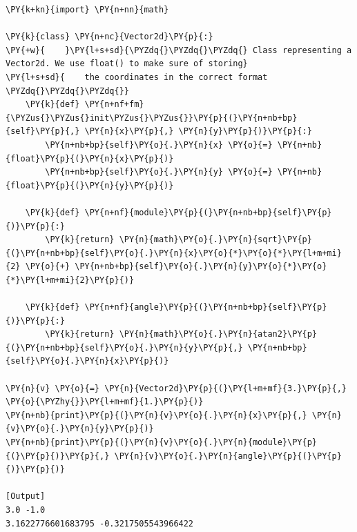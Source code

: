 \begin{Verbatim}[label=\makebox{\url{https://github.com/lucabaldini/cmepda/tree/master/slides/latex/snippets/vector2d\_xy.py}},commandchars=\\\{\}]
\PY{k+kn}{import} \PY{n+nn}{math}

\PY{k}{class} \PY{n+nc}{Vector2d}\PY{p}{:}
\PY{+w}{    }\PY{l+s+sd}{\PYZdq{}\PYZdq{}\PYZdq{} Class representing a Vector2d. We use float() to make sure of storing}
\PY{l+s+sd}{    the coordinates in the correct format \PYZdq{}\PYZdq{}\PYZdq{}}   
    \PY{k}{def} \PY{n+nf+fm}{\PYZus{}\PYZus{}init\PYZus{}\PYZus{}}\PY{p}{(}\PY{n+nb+bp}{self}\PY{p}{,} \PY{n}{x}\PY{p}{,} \PY{n}{y}\PY{p}{)}\PY{p}{:}
        \PY{n+nb+bp}{self}\PY{o}{.}\PY{n}{x} \PY{o}{=} \PY{n+nb}{float}\PY{p}{(}\PY{n}{x}\PY{p}{)}
        \PY{n+nb+bp}{self}\PY{o}{.}\PY{n}{y} \PY{o}{=} \PY{n+nb}{float}\PY{p}{(}\PY{n}{y}\PY{p}{)}
   
    \PY{k}{def} \PY{n+nf}{module}\PY{p}{(}\PY{n+nb+bp}{self}\PY{p}{)}\PY{p}{:}
        \PY{k}{return} \PY{n}{math}\PY{o}{.}\PY{n}{sqrt}\PY{p}{(}\PY{n+nb+bp}{self}\PY{o}{.}\PY{n}{x}\PY{o}{*}\PY{o}{*}\PY{l+m+mi}{2} \PY{o}{+} \PY{n+nb+bp}{self}\PY{o}{.}\PY{n}{y}\PY{o}{*}\PY{o}{*}\PY{l+m+mi}{2}\PY{p}{)}
       
    \PY{k}{def} \PY{n+nf}{angle}\PY{p}{(}\PY{n+nb+bp}{self}\PY{p}{)}\PY{p}{:}
        \PY{k}{return} \PY{n}{math}\PY{o}{.}\PY{n}{atan2}\PY{p}{(}\PY{n+nb+bp}{self}\PY{o}{.}\PY{n}{y}\PY{p}{,} \PY{n+nb+bp}{self}\PY{o}{.}\PY{n}{x}\PY{p}{)}
  
\PY{n}{v} \PY{o}{=} \PY{n}{Vector2d}\PY{p}{(}\PY{l+m+mf}{3.}\PY{p}{,} \PY{o}{\PYZhy{}}\PY{l+m+mf}{1.}\PY{p}{)}
\PY{n+nb}{print}\PY{p}{(}\PY{n}{v}\PY{o}{.}\PY{n}{x}\PY{p}{,} \PY{n}{v}\PY{o}{.}\PY{n}{y}\PY{p}{)}
\PY{n+nb}{print}\PY{p}{(}\PY{n}{v}\PY{o}{.}\PY{n}{module}\PY{p}{(}\PY{p}{)}\PY{p}{,} \PY{n}{v}\PY{o}{.}\PY{n}{angle}\PY{p}{(}\PY{p}{)}\PY{p}{)}

[Output]
3.0 -1.0
3.1622776601683795 -0.3217505543966422
\end{Verbatim}